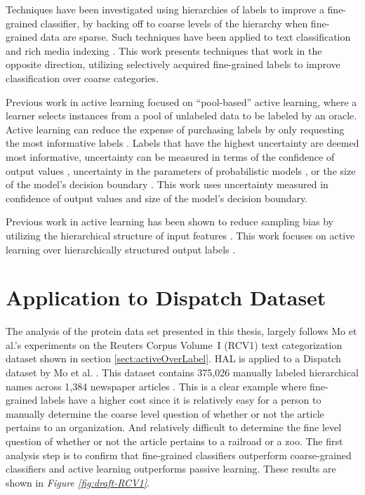 \documentclass[ms]{nuthesis}
\begin{document}
\par Techniques have been investigated using hierarchies of labels to improve
  a fine-grained classifier, by backing off to coarse levels of the hierarchy
  when fine-grained data are sparse. Such techniques have been applied to
  text classification \cite{mccallum1998improving} and rich media indexing
  \cite{jiang2013}. This work presents techniques that work in the opposite
  direction, utilizing selectively acquired fine-grained labels to improve
  classification over coarse categories.

\par Previous work in active learning
focused on ``pool-based'' active learning, where a learner selects
instances from a pool of unlabeled data to be labeled by an oracle.
Active learning can reduce the expense of purchasing labels by only
requesting the most informative labels \cite{Rubens2011}. Labels that
have the highest uncertainty are deemed most informative, uncertainty
can be measured in terms of the confidence of output values
\cite{Merialdo2001}, uncertainty in the parameters of probabilistic models
\cite{Hofmann2003}, or the size of the model's decision boundary
\cite{Schohn2000}. This work uses uncertainty measured in confidence of
output values and size of the model's decision boundary.

\par Previous work in active learning has been shown to reduce
sampling bias by utilizing the hierarchical structure of input
features \cite{Dasgupta2008, Symons2006}. This work focuses on
active learning over hierarchically structured output
labels \cite{yugi}.


\section{Application to Dispatch Dataset}
\par The analysis of the protein data set presented in this thesis, largely
follows Mo et al.'s \cite{yugi} experiments on the Reuters Corpus Volume~I (RCV1)
 text categorization dataset shown in section \ref{sect:activeOverLabel}. HAL is
 applied to a Dispatch dataset by Mo et al. \cite{yugi}. This dataset contains 375,026 manually labeled
hierarchical names across 1,384 newspaper articles \cite{Lewis2004}. This is a
clear example where
fine-grained labels have a higher cost since it is relatively easy for a person to manually
determine the coarse level question of whether or not the article pertains to an organization.
And relatively difficult to determine the fine level question of whether or not the article
pertains to a railroad or a zoo. The first
analysis step is to confirm that fine-grained classifiers outperform
coarse-grained classifiers and active learning outperforms passive learning. These results are
shown in \textit{Figure \ref{fig:draft-RCV1}}.
\end{document}

